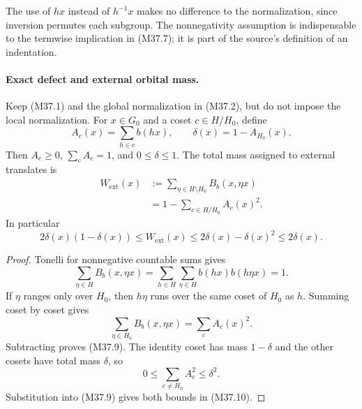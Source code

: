 The use of $hx$ instead of $h^{-1}x$ makes no difference
to the normalization, since inversion permutes each
subgroup.  The nonnegativity assumption is indispensable
to the termwise implication in (M37.7); it is part of
the source's definition of an indentation.

\paragraph{Exact defect and external orbital mass.}
Keep (M37.1) and the global normalization in (M37.2),
but do not impose the local normalization.  For $x\in G_0$
and a coset $c\in H/H_0$, define
\[
 A_c(x)=\sum_{h\in c}b(hx),\qquad
 \delta(x)=1-A_{H_0}(x).
 \tag{M37.8}
\]
Then $A_c\ge0$, $\sum_cA_c=1$, and $0\le\delta\le1$.
The total mass assigned to external translates is
\[
 \begin{split}
 W_{\mathrm{ext}}(x)
   &:=\sum_{\eta\in H\setminus H_0}B_b(x,\eta x)\\
   &=1-\sum_{c\in H/H_0}A_c(x)^2.
 \end{split}
 \tag{M37.9}
\]
In particular
\[
       2\delta(x)(1-\delta(x))
          \le W_{\mathrm{ext}}(x)
          \le2\delta(x)-\delta(x)^2\le2\delta(x).
 \tag{M37.10}
\]

\begin{proof}
Tonelli for nonnegative countable sums gives
\[
 \sum_{\eta\in H}B_b(x,\eta x)
    =\sum_{h\in H}\sum_{\eta\in H}b(hx)b(h\eta x)=1.
 \tag{M37.11}
\]
If $\eta$ ranges only over $H_0$, then $h\eta$ runs
over the same coset of $H_0$ as $h$.  Summing coset
by coset gives
\[
                   \sum_{\eta\in H_0}B_b(x,\eta x)
                              =\sum_c A_c(x)^2.
 \tag{M37.12}
\]
Subtracting proves (M37.9).  The identity coset has
mass $1-\delta$ and the other cosets have total mass
$\delta$, so
\[
       0\le\sum_{c\ne H_0}A_c^2\le\delta^2.
 \tag{M37.13}
\]
Substitution into (M37.9) gives both bounds in (M37.10).
\end{proof}


